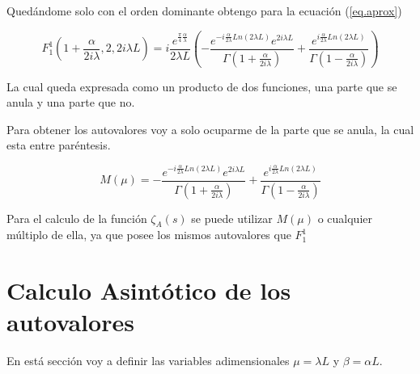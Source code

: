 
Quedándome solo con el orden dominante obtengo para la ecuación (\ref{eq.aprox}) %

\begin{equation}
    F _1 ^1 (1+  \frac{  \alpha}{2 i \lambda} ,2 ,2 i \lambda L  ) = 
   i  \frac{e ^{ \frac{\pi}{4} \frac{\alpha}{\lambda} } }{2 \lambda L}
    \left( -
    \frac{e ^{- i \frac{\alpha}{2 \lambda} Ln(2 \lambda L) } e ^{2 i \lambda L} }{\Gamma(1+\frac{ \alpha}{2 i \lambda})} +
    \frac{e ^{  i \frac{\alpha}{2 \lambda} Ln(2 \lambda L) }}               {\Gamma(1-\frac{ \alpha}{2 i \lambda})}
    \right)
\label{eq.completa}
\end{equation}




La cual queda expresada como un producto de dos funciones, una parte que se anula y una parte que no.

Para obtener los autovalores voy a solo ocuparme de la parte que se anula, la cual esta entre paréntesis.

\begin{equation}
    M (\mu) = 
    - \frac{e ^{- i \frac{\alpha}{2 \lambda} Ln(2 \lambda L) } e ^{2 i \lambda L} }{\Gamma(1+\frac{ \alpha}{2 i \lambda})} +
    \frac{e ^{  i \frac{\alpha}{2 \lambda} Ln(2 \lambda L) }}               {\Gamma(1-\frac{ \alpha}{2 i \lambda})}
\label{eq.aproxx}
\end{equation}

Para el calculo de la función $\zeta _A (s) $ se puede utilizar $M ( \mu )$ o cualquier múltiplo de ella, ya que posee los mismos autovalores que $F_1 ^1 $




\section{Calculo Asintótico de los autovalores}


En está sección voy a definir las variables adimensionales $\mu = \lambda L $ y $\beta = \alpha L$.

